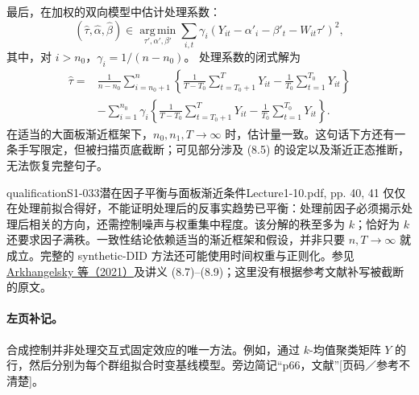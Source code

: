 最后，在加权的双向模型中估计处理系数：
\[
 (\widehat\tau,\widehat\alpha,\widehat\beta)
 \in\operatorname*{arg\,min}_{\tau',\alpha',\beta'}
 \sum_{i,t}\gamma_i
 (Y_{it}-\alpha'_i-\beta'_t-W_{it}\tau')^2,\tag{8.8}
\]
其中，对 $i>n_0$，$\gamma_i=1/(n-n_0)$。
处理系数的闭式解为
\begin{align*}
 \widehat\tau={}&\frac1{n-n_0}\sum_{i=n_0+1}^n
 \left\{\frac1{T-T_0}\sum_{t=T_0+1}^TY_{it}
 -\frac1{T_0}\sum_{t=1}^{T_0}Y_{it}\right\}\\
 &-\sum_{i=1}^{n_0}\gamma_i
 \left\{\frac1{T-T_0}\sum_{t=T_0+1}^TY_{it}
 -\frac1{T_0}\sum_{t=1}^{T_0}Y_{it}\right\}.
\end{align*}
在适当的大面板渐近框架下，$n_0,n_1,T\to\infty$ 时，估计量一致。这句话下方还有一条手写限定，但被扫描页底截断；可见部分涉及 (8.5) 的设定以及渐近正态推断，无法恢复完整句子。
\begin{reviewnote}{qualification}{S1-033}{潜在因子平衡与面板渐近条件}{Lecture1-10.pdf, pp. 40, 41}
仅仅在处理前拟合得好，不能证明处理后的反事实趋势已平衡：处理前因子必须揭示处理后相关的方向，还需控制噪声与权重集中程度。该分解的秩至多为 $k$；恰好为 $k$ 还要求因子满秩。一致性结论依赖适当的渐近框架和假设，并非只要 $n,T\to\infty$ 就成立。完整的 synthetic-DID 方法还可能使用时间权重与正则化。参见 \href{https://www.aeaweb.org/articles?id=10.1257/aer.20190159}{Arkhangelsky 等（2021）}及讲义 (8.7)--(8.9)；这里没有根据参考文献补写被截断的原文。
\end{reviewnote}


\paragraph{左页补记。}
合成控制并非处理交互式固定效应的唯一方法。例如，通过 $k$-均值聚类矩阵 $Y$ 的行，然后分别为每个群组拟合时变基线模型。旁边简记“p66，文献”[页码／参考不清楚]。

